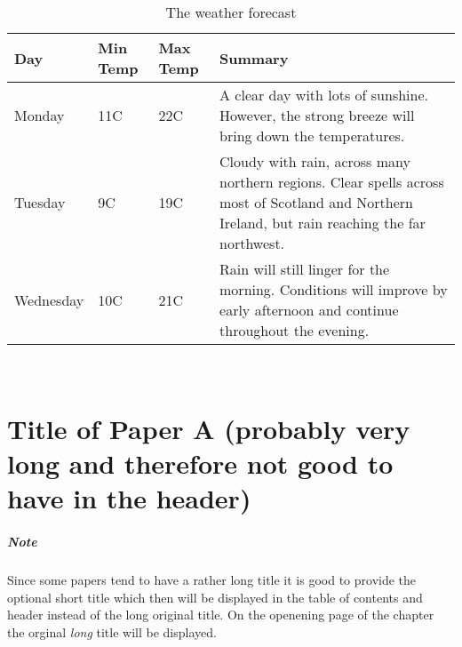 \documentclass[%
    norsk,  %
]{USN-BSc}
\begin{document}
\lipsum[4]

\begin{table}[!ht]
 \caption{The weather forecast}
  \centering
   \begin{tabular}{ | l | l | l | p{5cm} |}
    \hline
    Day & Min Temp & Max Temp & Summary \\ \hline
    Monday & 11C & 22C & A clear day with lots of sunshine.
    However, the strong breeze will bring down the temperatures. \\ \hline
    Tuesday & 9C & 19C & Cloudy with rain, across many northern regions. Clear spells
    across most of Scotland and Northern Ireland,
    but rain reaching the far northwest. \\ \hline
    Wednesday & 10C & 21C & Rain will still linger for the morning.
    Conditions will improve by early afternoon and continue
    throughout the evening. \\
    \hline
    \end{tabular}
\end{table}


~\nocite{*}

\cleardoublepage

\printbibliography[heading=bibintoc]


\appendix
\renewcommand{\appendixname}{Paper} %



\chapter[Short Title of Paper A]{Title of Paper A (probably very long and therefore not good to have in the header)}
\label{paper-a}

\paragraph{Note}
Since some papers tend to have a rather long title it is good to provide the optional short title which then will be displayed in the table of contents and header instead of the long original title.
On the openening page of the chapter the orginal \emph{long} title will be displayed.\bigskip
\end{document}

